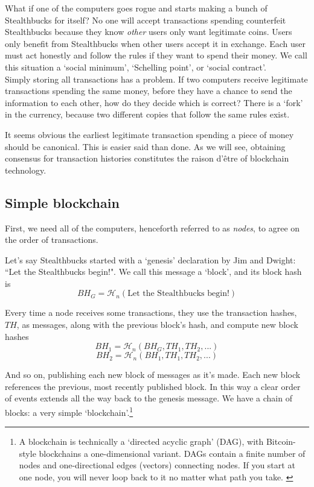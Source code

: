 What if one of the computers goes rogue and starts making a bunch of Stealthbucks for itself? No one will accept transactions spending counterfeit Stealthbucks because they know {\em other} users only want legitimate coins. Users only benefit from Stealthbucks when other users accept it in exchange. Each user must act honestly and follow the rules if they want to spend their money. We call this situation a `social minimum', `Schelling point', or `social contract'.\\


Simply storing all transactions has a problem. If two computers receive legitimate transactions spending the same money, before they have a chance to send the information to each other, how do they decide which is correct? There is a `fork' in the currency, because two different copies that follow the same rules exist.

It seems obvious the earliest legitimate transaction spending a piece of money should be canonical. This is easier said than done. As we will see, obtaining consensus for transaction histories constitutes the raison d'\^{e}tre of blockchain technology.


\subsection{Simple blockchain}
\label{subsec:simple-blockchain}

First, we need all of the computers, henceforth referred to as {\em nodes}, to agree on the order of transactions.

Let's say Stealthbucks started with a `genesis' declaration by Jim and Dwight: ``Let the Stealthbucks begin!". We call this message a `block', and its block hash is 
\[ \mathit{BH}_G = \mathcal{H}_n(\textrm{Let the Stealthbucks begin!}) \]

Every time a node receives some transactions, they use the transaction hashes, $\mathit{TH}$, as messages, along with the previous block's hash, and compute new block hashes
\[ \mathit{BH}_1 = \mathcal{H}_n(\mathit{BH}_G, \mathit{TH}_1, \mathit{TH}_2,...) \]
\[ \mathit{BH}_2 = \mathcal{H}_n(\mathit{BH}_1, \mathit{TH}_1, \mathit{TH}_2,...) \]

And so on, publishing each new block of messages as it's made. Each new block references the previous, most recently published block. In this way a clear order of events extends all the way back to the genesis message. We have a chain of blocks: a very simple `blockchain'.\footnote{A blockchain is technically a `directed acyclic graph' (DAG), with Bitcoin-style blockchains a one-dimensional variant. DAGs contain a finite number of nodes and one-directional edges (vectors) connecting nodes. If you start at one node, you will never loop back to it no matter what path you take. \cite{DAG-wikipedia}}

